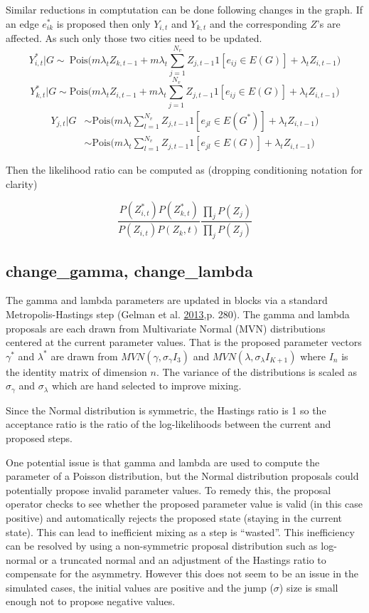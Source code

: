 \documentclass[11pt,a4paper]{article}
\numberwithin{equation}{section}
\begin{document}
Similar reductions in comptutation can be done following changes in the
graph. If an edge \(e^*_{ik}\) is proposed then only \(Y_{i,t}\) and
\(Y_{k,t}\) and the corresponding \(Z\)'s are affected. As such only
those two cities need to be updated.
\[Y^*_{i,t}|G \sim ~ \text{Pois}\big(m\lambda_tZ_{k,t-1} +m\lambda_t\sum_{j=1}^{N_v}Z_{j,t-1}1[e_{ij}\in E(G)]+ \lambda_tZ_{i,t-1}\big) \]
\[Y^*_{k,t}|G \sim  \text{Pois}\big(m\lambda_tZ_{i,t-1} +m\lambda_t\sum_{j=1}^{N_v}Z_{j,t-1}1[e_{ij}\in E(G)]+ \lambda_tZ_{i,t-1}\big) \]
\[\begin{aligned} Y_{j,t}|G &\sim \text{Pois}\big(m\lambda_t\sum_{l=1}^{N_v}Z_{j,t-1}1[e_{jl}\in E(G^*)]+ \lambda_tZ_{i,t-1}\big)\\ & \sim  \text{Pois}\big(m\lambda_t\sum_{l=1}^{N_v}Z_{j,t-1}1[e_{jl}\in E(G)]+ \lambda_tZ_{i,t-1}\big) \end{aligned}\]

Then the likelihood ratio can be computed as (dropping conditioning
notation for clarity)

\[ \frac{P(Z^*_{i,t})P(Z^*_{k,t})}{P(Z_{i,t})P(Z_k,t)}\frac{\prod_j P(Z_{j})}{\prod_{j}P( Z_{j})} \]

\hypertarget{change_gamma-change_lambda}{%
\subsection{change\_gamma,
change\_lambda}\label{change_gamma-change_lambda}}

The gamma and lambda parameters are updated in blocks via a standard
Metropolis-Hastings step (Gelman et al.
\protect\hyperlink{ref-gelman_bayesian_2013}{2013},p. 280). The gamma
and lambda proposals are each drawn from Multivariate Normal (MVN)
distributions centered at the current parameter values. That is the
proposed parameter vectors \(\gamma^*\) and \(\lambda^*\) are drawn from
\(MVN(\gamma, \sigma_\gamma I_3)\) and
\(MVN(\lambda, \sigma_\lambda I_{K+1})\) where \(I_n\) is the identity
matrix of dimension \(n\). The variance of the distributions is scaled
as \(\sigma_\gamma\) and \(\sigma_\lambda\) which are hand selected to
improve mixing.

Since the Normal distribution is symmetric, the Hastings ratio is 1 so
the acceptance ratio is the ratio of the log-likelihoods between the
current and proposed steps.

One potential issue is that gamma and lambda are used to compute the
parameter of a Poisson distribution, but the Normal distribution
proposals could potentially propose invalid parameter values. To remedy
this, the proposal operator checks to see whether the proposed parameter
value is valid (in this case positive) and automatically rejects the
proposed state (staying in the current state). This can lead to
inefficient mixing as a step is ``wasted''. This inefficiency can be
resolved by using a non-symmetric proposal distribution such as
log-normal or a truncated normal and an adjustment of the Hastings ratio
to compensate for the asymmetry. However this does not seem to be an
issue in the simulated cases, the initial values are positive and the
jump (\(\sigma\)) size is small enough not to propose negative values.
\end{document}
